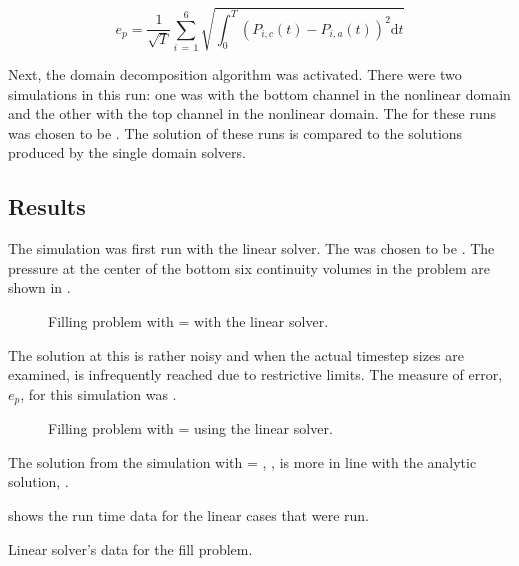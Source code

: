 \begin{equation}
\label{eqn:vpmPressureError}
e_{p} =  \frac{1}{\sqrt{T}} \sum_{i\,=\,1}^{6}\sqrt{\int_{0}^{T} \left(P_{i,c}(t) - P_{i,a}(t)\right)^{2} \mathrm{d} t}
\end{equation}

Next, the domain decomposition algorithm was activated.
There were two simulations in this run: one was with the bottom channel in the nonlinear domain and the other with the top channel in the nonlinear domain.
The \dtmax{} for these runs was chosen to be .
The solution of these runs is compared to the solutions produced by the single domain solvers.

\subsection{Results}
\label{subsect:vmpResults}

The simulation was first run with the linear solver.
The \dtmax{} was chosen to be .
The pressure at the center of the bottom six continuity volumes in the problem are shown in .

\begin{figure}[h!t]
\centering

\caption{Filling problem with \dtmax{} =  with the linear solver.}
\label{fig:linFill1em1}
\end{figure}

The solution at this \dtmax{} is rather noisy and when the actual timestep sizes are examined, \dtmax{} is infrequently reached due to restrictive \dtcrnt{} limits.
The measure of error, $e_{p}$, for this simulation was .

\begin{figure}[h!t]
\centering

\caption{Filling problem with \dtmax{} =  using the linear solver.}
\label{fig:vmpLinFill5em2}
\end{figure}

The solution from the simulation with \dtmax{} = , , is more in line with the analytic solution, .

 shows the run time data for the linear cases that were run.

\begin{table}[ht]
\centering
\singlespace

\caption{Linear solver's data for the fill problem.}
\label{tab:vmpLinRunTime}
\end{table}


